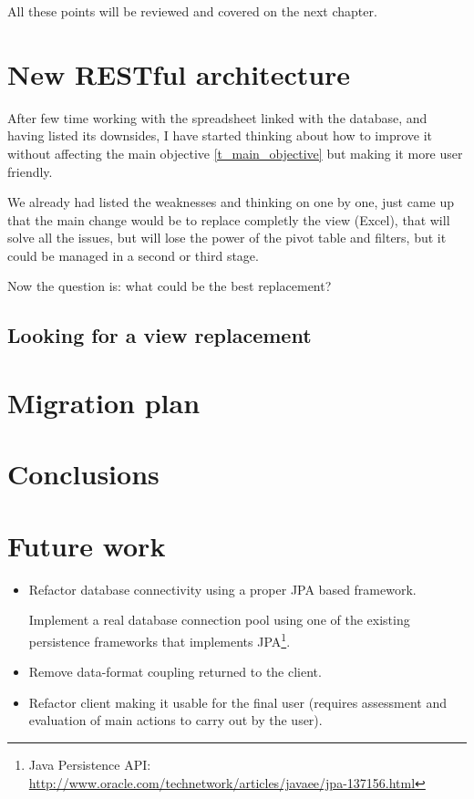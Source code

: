All these points will be reviewed and covered on the next chapter. 

\chapter{New RESTful architecture}
After few time working with the spreadsheet linked with the database, and having
listed its downsides, I have started thinking about how to improve it without
affecting the main objective \ref{t_main_objective} but making it more
user friendly.

We already had listed the weaknesses and thinking on one by one, just came up
that the main change would be to replace completly the view (Excel), that
will solve all the issues, but will lose the power of the pivot table and
filters, but it could be managed in a second or third stage.

Now the question is: what could be the best replacement?

\section{Looking for a view replacement}


\chapter{Migration plan}

\chapter{Conclusions}

\chapter{Future work}
\begin{itemize}
	\item Refactor database connectivity using a proper JPA based framework.
  
	Implement a real database connection pool using one of the existing persistence
	frameworks that implements JPA\footnote{Java Persistence API:
	\url{http://www.oracle.com/technetwork/articles/javaee/jpa-137156.html}}.
	
	\item Remove data-format coupling returned to the client.
	\item Refactor client making it usable for the final user (requires assessment
	and evaluation of main actions to carry out by the user).
\end{itemize}

%
